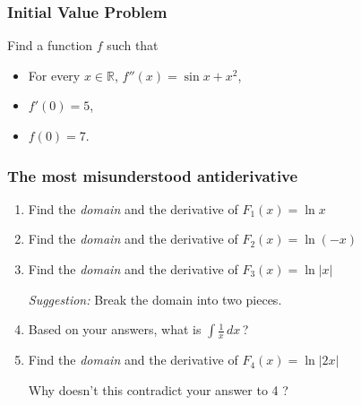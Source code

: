 \documentclass[14pt]{beamer}
\date{}
\title{}
\author{}
\begin{document}





	\begin{frame}[t]
		\frametitle{Initial Value Problem}

		Find a function $f$ such that
		\begin{itemize}
			\item For every $\displaystyle x \in \mathbb{R}$,
				$\displaystyle f''(x) = \sin x + x^{2}$,

			\item $\displaystyle f'(0) = 5$,

			\item $\displaystyle f(0) = 7$.
		\end{itemize}
	\end{frame}

	\begin{frame}[t]
		\fontsize{13}{13}\selectfont
		\frametitle{The most misunderstood antiderivative}
		\begin{enumerate}
			\item Find the \emph{domain} and the derivative of \;
				$\displaystyle F_{1}(x) = \ln x$
				\vspace{.1cm}

			\item Find the \emph{domain} and the derivative of \;
				$\displaystyle F_{2}(x) = \ln (-x)$
				\vspace{.1cm}

			\item Find the \emph{domain} and the derivative of \;
				$\displaystyle F_{3}(x) = \ln |x|$
				\vspace{.1cm}

				\emph{Suggestion:} Break the domain into two pieces.
				\vspace{.1cm}

			\item \label{qu:ln} Based on your answers, what is
				$\displaystyle \int \frac{1}{x}\,dx \,$?
				\vspace{.1cm}

			\item Find the \emph{domain} and the derivative of \;
				$\displaystyle F_{4}(x) = \ln |2x|$
				\vspace{.1cm}

				Why doesn't this contradict your answer to {\color{blue} 4} ?
		\end{enumerate}
	\end{frame}
\end{document}
